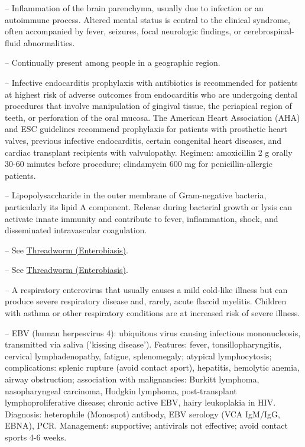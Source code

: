 -- Inflammation of the brain parenchyma, usually due to infection or an autoimmune process. Altered mental status is central to the clinical syndrome, often accompanied by fever, seizures, focal neurologic findings, or cerebrospinal-fluid abnormalities.

-- Continually present among people in a geographic region.

-- Infective endocarditis prophylaxis with antibiotics is recommended for patients at highest risk of adverse outcomes from endocarditis who are undergoing dental procedures that involve manipulation of gingival tissue, the periapical region of teeth, or perforation of the oral mucosa. The American Heart Association (AHA) and ESC guidelines recommend prophylaxis for patients with prosthetic heart valves, previous infective endocarditis, certain congenital heart diseases, and cardiac transplant recipients with valvulopathy. Regimen: amoxicillin 2 g orally 30-60 minutes before procedure; clindamycin 600 mg for penicillin-allergic patients.

-- Lipopolysaccharide in the outer membrane of Gram-negative bacteria, particularly its lipid A component. Release during bacterial growth or lysis can activate innate immunity and contribute to fever, inflammation, shock, and disseminated intravascular coagulation.

-- See \hyperlink{Threadworm (Enterobiasis)}{Threadworm (Enterobiasis)}.

-- See \hyperlink{Threadworm (Enterobiasis)}{Threadworm (Enterobiasis)}.

-- A respiratory enterovirus that usually causes a mild cold-like illness but can produce severe respiratory disease and, rarely, acute flaccid myelitis. Children with asthma or other respiratory conditions are at increased risk of severe illness.

-- EBV (human herpesvirus 4): ubiquitous virus causing infectious mononucleosis, transmitted via saliva ('kissing disease'). Features: fever, tonsillopharyngitis, cervical lymphadenopathy, fatigue, splenomegaly; atypical lymphocytosis; complications: splenic rupture (avoid contact sport), hepatitis, hemolytic anemia, airway obstruction; association with malignancies: Burkitt lymphoma, nasopharyngeal carcinoma, Hodgkin lymphoma, post-transplant lymphoproliferative disease; chronic active EBV, hairy leukoplakia in HIV. Diagnosis: heterophile (Monospot) antibody, EBV serology (VCA IgM/IgG, EBNA), PCR. Management: supportive; antivirals not effective; avoid contact sports 4-6 weeks.

